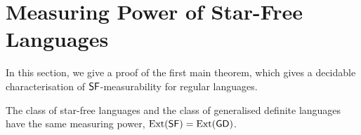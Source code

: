 \section{Measuring Power of Star-Free Languages}\label{sec:sf}
In this section, we give a proof of the first main theorem, which gives a decidable characterisation of \(\sf\)-measurability for regular languages.
\begin{theorem}[S.-Y.]\label{thm:sf}
The class of star-free languages and the class of generalised definite languages have the same measuring power, \ie \(\ext(\sf) = \ext(\gd)\).
\end{theorem}



